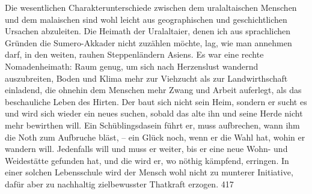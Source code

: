 Die wesentlichen Charakterunterschiede zwischen dem uralaltaischen Menschen und dem malaischen sind wohl leicht aus geographischen und geschichtlichen Ursachen abzuleiten. Die Heimath der Uralaltaier, denen ich aus sprachlichen Gründen die Sumero-Akkader nicht zuzählen möchte, lag, wie man annehmen darf, in den weiten, rauhen Steppenländern Asiens. Es war eine rechte Nomadenheimath: Raum genug, um sich nach Herzenslust wandernd auszubreiten, Boden und Klima mehr zur Viehzucht als zur Landwirthschaft einladend, die ohnehin dem Menschen mehr Zwang und Arbeit auferlegt, als das beschauliche Leben des Hirten. Der baut sich nicht sein Heim, sondern er sucht es und wird sich wieder ein neues suchen, sobald das alte ihn und seine Herde nicht mehr bewirthen will. Ein Schüblingsdasein führt er, muss aufbrechen, wann ihm die Noth zum Aufbruche bläst, – ein Glück noch, wenn er die Wahl hat, wohin er wandern will. Jedenfalls will und muss er weiter, bis er eine neue Wohn- und Weidestätte gefunden hat, und die wird er, wo nöthig kämpfend, erringen. In einer solchen Lebensschule wird der Mensch wohl nicht zu munterer Initiative, dafür aber zu nachhaltig zielbewusster Thatkraft erzogen.  {\textbar}{\textbar}417{\textbar}{\textbar}\label{sp.417} 

